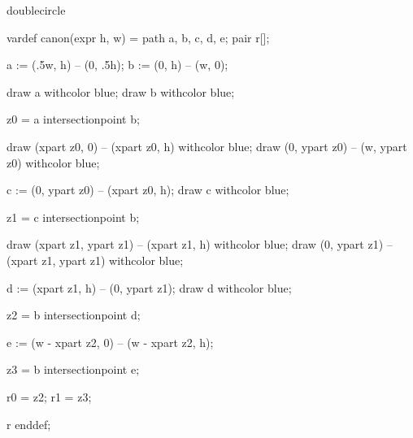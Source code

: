 %
%
%

%

\startenvironment doublecircle

	\startMPdefinitions
		vardef canon(expr h, w) =
			path a, b, c, d, e;
			pair r[];

			a := (.5w, h) -- (0, .5h);
			b := (0, h) -- (w, 0);

			draw a withcolor blue;
			draw b withcolor blue;

			z0 = a intersectionpoint b; %

			draw (xpart z0, 0) -- (xpart z0, h) withcolor blue;
			draw (0, ypart z0) -- (w, ypart z0) withcolor blue;

			c := (0, ypart z0) -- (xpart z0, h);
			draw c withcolor blue;

			z1 = c intersectionpoint b;

			draw (xpart z1, ypart z1) -- (xpart z1, h) withcolor blue;
			draw (0, ypart z1) -- (xpart z1, ypart z1) withcolor blue;

			d := (xpart z1, h) -- (0, ypart z1);
			draw d withcolor blue;

			z2 = b intersectionpoint d; %

			e := (w - xpart z2, 0) -- (w - xpart z2, h); %

			z3 = b intersectionpoint e; %

			r0 = z2; %
			r1 = z3; %

			r
		enddef;
	\stopMPdefinitions

\stopenvironment

